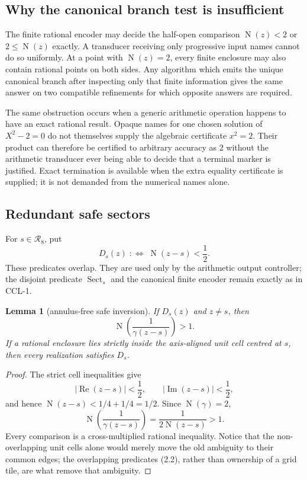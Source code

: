 \documentclass[10pt]{article}
\newtheorem{lemma}[theorem]{Lemma}
\theoremstyle{definition}
\theoremstyle{remark}
\newcommand{\Norm}{\operatorname{N}}
\newcommand{\Ree}{\operatorname{Re}}
\newcommand{\Imm}{\operatorname{Im}}
\begin{document}
\subsection{Why the canonical branch test is insufficient}

The finite rational encoder may decide the half-open comparison $\Norm(z)<2$ or $2\le\Norm(z)$ exactly.  A transducer receiving only progressive input names cannot do so uniformly.  At a point with $\Norm(z)=2$, every finite enclosure may also contain rational points on both sides.  Any algorithm which emits the unique canonical branch after inspecting only that finite information gives the same answer on two compatible refinements for which opposite answers are required.

The same obstruction occurs when a generic arithmetic operation happens to have an exact rational result.  Opaque names for one chosen solution of $X^2-2=0$ do not themselves supply the algebraic certificate $x^2=2$.  Their product can therefore be certified to arbitrary accuracy as $2$ without the arithmetic transducer ever being able to decide that a terminal marker is justified.  Exact termination is available when the extra equality certificate is supplied; it is not demanded from the numerical names alone.

\subsection{Redundant safe sectors}

For $s\in\mathcal R_8$, put
\[
 D_s(z)\;:\Longleftrightarrow\;\Norm(z-s)<\frac12.
\tag{2.2}
\]
These predicates overlap.  They are used only by the arithmetic output
controller; the disjoint predicate $\operatorname{Sect}_s$ and the canonical
finite encoder remain exactly as in CCL-1.

\begin{lemma}[annulus-free safe inversion]\label{lem:redundant-safe-inversion}
If $D_s(z)$ and $z\ne s$, then
\[
 \Norm\!\left(\frac1{\gamma(z-s)}\right)>1.
\tag{2.3}
\]
If a rational enclosure lies strictly inside the axis-aligned unit cell centred at $s$, then every realization satisfies $D_s$.
\end{lemma}

\begin{proof}
The strict cell inequalities give
\[
 |\Ree(z-s)|<\frac12,
 \qquad |\Imm(z-s)|<\frac12,
\]
and hence $\Norm(z-s)<1/4+1/4=1/2$.  Since $\Norm(\gamma)=2$,
\[
 \Norm\!\left(\frac1{\gamma(z-s)}\right)
 =\frac1{2\Norm(z-s)}>1.
\]
Every comparison is a cross-multiplied rational inequality.  Notice that the non-overlapping unit cells alone would merely move the old ambiguity to their common edges; the overlapping predicates (2.2), rather than ownership of a grid tile, are what remove that ambiguity.
\end{proof}
\end{document}
